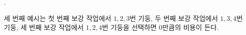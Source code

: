 \begin{problem}{\probno{}. \probtitle{}}
\Example

\begin{example}
\end{example}

세 번째 예시는 첫 번째 보강 작업에서 $1, 2, 3$번 기둥, 두 번째 보강 작업에서 $1, 3, 4$번 기둥, 세 번째 보강 작업에서 $1, 2, 4$번 기둥을 선택하면 $0$만큼의 비용이 든다.




\end{problem}
